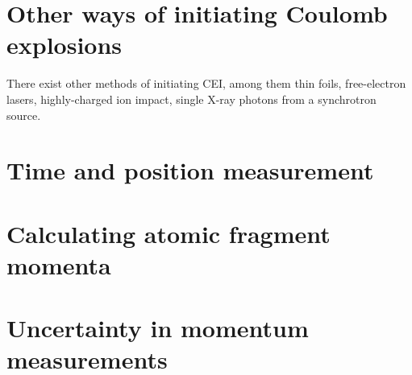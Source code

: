 \section{Other ways of initiating Coulomb explosions}
There exist other methods of initiating CEI, among them thin foils, free-electron lasers, highly-charged ion impact, single X-ray photons from a synchrotron source.

\section{Time and position measurement}

\section{Calculating atomic fragment momenta}

\section{Uncertainty in momentum measurements}